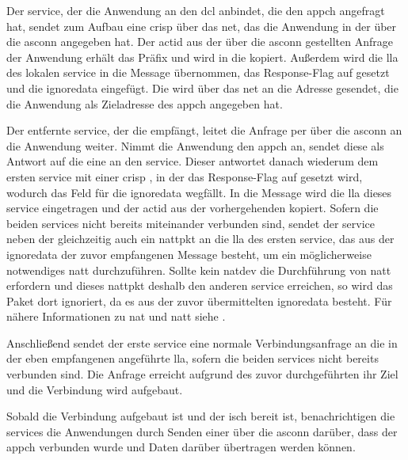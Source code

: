 Der \gls{service}, der die Anwendung an den \gls{dcl} anbindet, die den
\gls{appch} angefragt hat, sendet zum Aufbau eine \acrshort{crisp}
\msg{\crispneighreq} über das \gls{net}, das die Anwendung in der
\msg{\asprotoappchoutreq} über die \gls{asconn} angegeben hat.
Der \gls{actid} aus der über die \gls{asconn} gestellten Anfrage der Anwendung
erhält das Präfix  und wird in die
\msg{\crispneighreq} kopiert.
Außerdem wird die \gls{lla} des lokalen \gls{service} in die Message übernommen,
das Response-Flag auf  gesetzt und die \gls{ignoredata} eingefügt.
Die \msg{\crispneighreq} wird über das \gls{net} an die Adresse gesendet, die
die Anwendung als Zieladresse des \gls{appch} angegeben hat.

Der entfernte \gls{service}, der die \msg{\crispneighreq} empfängt, leitet die
Anfrage per \msg{\asprotoappchinreq} über die \gls{asconn} an die Anwendung
weiter.
Nimmt die Anwendung den \gls{appch} an, sendet diese als Antwort auf die
\msg{\asprotoappchinreq} eine \msg{\asprotoappchaccept} an den \gls{service}.
Dieser antwortet danach wiederum dem ersten \gls{service} mit einer
\acrshort{crisp} \msg{\crispneighreq}, in der das Response-Flag auf 
gesetzt wird, wodurch das Feld für die \gls{ignoredata} wegfällt.
In die Message wird die \gls{lla} dieses \gls{service} eingetragen und der
\gls{actid} aus der vorhergehenden \msg{\crispneighreq} kopiert.
Sofern die beiden \glspl{service} nicht bereits miteinander verbunden sind,
sendet der \gls{service} neben der \msg{\crispneighreq} gleichzeitig auch ein
\gls{nattpkt} an die \gls{lla} des ersten \gls{service}, das aus der
\gls{ignoredata} der zuvor empfangenen Message besteht, um ein möglicherweise
notwendiges \gls{natt} durchzuführen.
Sollte kein \gls{natdev} die Durchführung von \gls{natt} erfordern und dieses
\gls{nattpkt} deshalb den anderen \gls{service} erreichen, so wird das Paket
dort ignoriert, da es aus der zuvor übermittelten \gls{ignoredata} besteht.
Für nähere Informationen zu \gls{nat} und \gls{natt} siehe .

Anschließend sendet der erste \gls{service} eine normale Verbindungsanfrage an
die in der eben empfangenen \msg{\crispneighreq} angeführte \gls{lla}, sofern
die beiden \glspl{service} nicht bereits verbunden sind.
Die Anfrage erreicht aufgrund des zuvor durchgeführten
 ihr Ziel und die Verbindung wird aufgebaut.

Sobald die Verbindung aufgebaut ist und der \gls{isch} bereit ist,
benachrichtigen die \glspl{service} die Anwendungen durch Senden einer
\msg{\asprotoappchconnected} über die \gls{asconn} darüber, dass der \gls{appch}
verbunden wurde und Daten darüber übertragen werden können.

